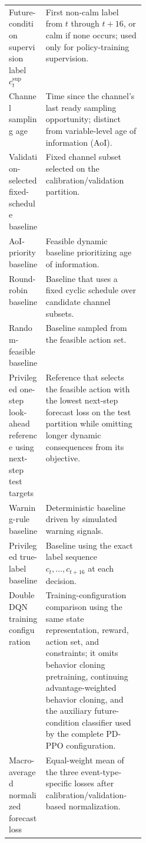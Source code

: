 \begin{tabularx}{0.96\linewidth}{@{}>{\raggedright\arraybackslash}p{0.27\linewidth}>{\raggedright\arraybackslash}X@{}}
  Future-condition supervision label $c_t^{\mathrm{sup}}$ & First non-calm label from $t$ through $t+16$, or calm if none occurs; used only for policy-training supervision. \\
  Channel sampling age & Time since the channel's last ready sampling opportunity; distinct from variable-level age of information (AoI). \\
  Validation-selected fixed-schedule baseline & Fixed channel subset selected on the calibration/validation partition. \\
  AoI-priority baseline & Feasible dynamic baseline prioritizing age of information. \\
  Round-robin baseline & Baseline that uses a fixed cyclic schedule over candidate channel subsets. \\
  Random-feasible baseline & Baseline sampled from the feasible action set. \\
  Privileged one-step look-ahead reference using next-step test targets & Reference that selects the feasible action with the lowest next-step forecast loss on the test partition while omitting longer dynamic consequences from its objective. \\
  Warning-rule baseline & Deterministic baseline driven by simulated warning signals. \\
  Privileged true-label baseline & Baseline using the exact label sequence $c_t,\ldots,c_{t+16}$ at each decision. \\
  Double DQN training configuration & Training-configuration comparison using the same state representation, reward, action set, and constraints; it omits behavior cloning pretraining, continuing advantage-weighted behavior cloning, and the auxiliary future-condition classifier used by the complete PD-PPO configuration. \\
  Macro-averaged normalized forecast loss & Equal-weight mean of the three event-type-specific losses after calibration/validation-based normalization. \\
  \bottomrule
\end{tabularx}
\endgroup
